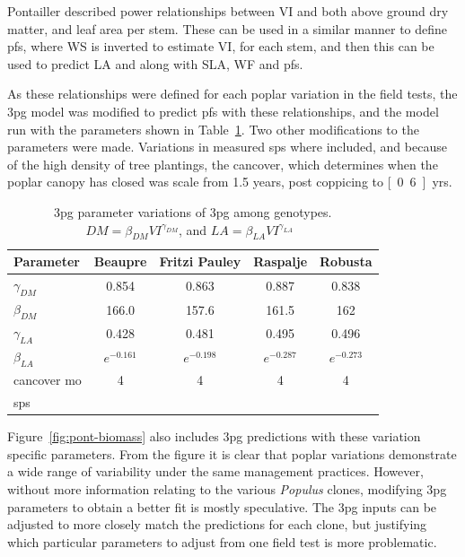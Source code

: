 \documentclass[10pt]{article}
\newcommand{\pop}{\textit{Populus} }
\begin{document}
Pontailler described power relationships between \ac{VI} and both above ground
dry matter, and leaf area per stem.  These can be used in a similar manner to
define \ac{pfs}, where \ac{WS} is inverted to estimate \ac{VI}, for each stem,
and then this can be used to predict \ac{LA} and along with \ac{SLA}, \ac{WF}
and \ac{pfs}.

As these relationships were defined for each poplar variation in the
field tests, the \ac{3pg} model was modified to predict \ac{pfs} with
these relationships, and the model run with the parameters shown in
Table~\ref{tab:pont-3pg}.  Two other modifications to the parameters
were made.  Variations in measured \ac{sps} where included, and
because of the high density of tree plantings, the \ac{cancover},
which determines when the poplar canopy has closed was scale from 1.5
years, post coppicing to \unit[0.6]{yrs}.

\begin{table}[!ht]
  \centering
  \begin{tabularx}{\linewidth}{X|c|c|c|c|}   
    Parameter & Beaupre & Fritzi Pauley & Raspalje & Robusta \\
    \hline
    $\gamma_{DM}$ &  0.854 & 0.863 & 0.887 & 0.838 \\
    $\beta_{DM}$  & 166.0 & 157.6 & 161.5 & 162  \\
    $\gamma_{LA}$ &  0.428 &  0.481 & 0.495 & 0.496 \\ 
    $\beta_{LA}$ & $e^{-0.161}$ & $e^{-0.198}$ & $e^{-0.287}$ & $e^{-0.273}$ \\
    \ac{cancover} \unit{mo} & 4 & 4 & 4 & 4 \\
    \ac{sps} & & & & \\
    \hline 
  \end{tabularx}
  \caption{\ac{3pg} parameter variations of \ac{3pg} among genotypes. $DM=\beta_{DM} VI^{\gamma_{DM}}$, and $LA = \beta_{LA} VI^{\gamma_{LA}}$~\cite{pontailler97-volume-index,Pontailler1999,Ceulemans1993}}
  \label{tab:pont-3pg}
\end{table}

Figure~\ref{fig:pont-biomass} also includes \ac{3pg} predictions with these
variation specific parameters.  From the figure it is clear that poplar
variations demonstrate a wide range of variability under the same management
practices.  However, without more information relating to the various \pop
clones, modifying \ac{3pg} parameters to obtain a better fit is mostly
speculative.  The \ac{3pg} inputs can be adjusted to more closely match the
predictions for each clone, but justifying which particular parameters to adjust
from one field test is more problematic.  
\end{document}
